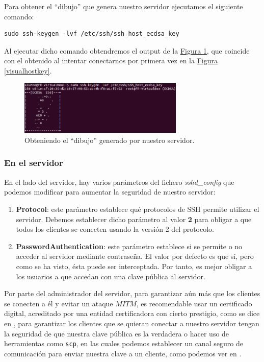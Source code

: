 \documentclass[10pt,a4paper,spanish]{article}
\begin{document}
Para obtener el ``dibujo'' que genera nuestro servidor ejecutamos el siguiente comando:
\begin{verbatim}
sudo ssh-keygen -lvf /etc/ssh/ssh_host_ecdsa_key
\end{verbatim}

Al ejecutar dicho comando obtendremos el output de la \hyperref[visualhostkey1]{Figura \ref*{visualhostkey1}}, que coincide con el obtenido al intentar conectarnos por primera vez en la \hyperref[visualhostkey]{Figura \ref*{visualhostkey}}.

\begin{figure}[!h]
    \centering
    \includegraphics[width=0.7\textwidth]{comprobacion_visualkey}
    \caption{Obteniendo el ``dibujo'' generado por nuestro servidor.}
    \label{visualhostkey1}
\end{figure}

\subsubsection{En el servidor}
En el lado del servidor, hay varios parámetros del fichero \textit{sshd\_config} que podemos modificar para aumentar la seguridad de nuestro servidor:
\begin{enumerate}[$\bullet$]
    \item \textbf{Protocol}: este parámetro establece qué protocolos de SSH permite utilizar el servidor. Debemos establecer dicho parámetro al valor \textbf{2} para obligar a que todos los clientes se conecten usando la versión 2 del protocolo.
    \item \textbf{PasswordAuthentication}: este parámetro establece si se permite o no acceder al servidor mediante contraseña. El valor por defecto es que sí, pero como se ha visto, ésta puede ser interceptada. Por tanto, es mejor obligar a los usuarios a que accedan con una clave pública al servidor.
\end{enumerate}

Por parte del administrador del servidor, para garantizar aún más que los clientes se conecten a él y evitar un ataque $MITM$, es recomendable usar un certificado digital, acreditado por una entidad certificadora con cierto prestigio, como se dice en \cite{ca}, para garantizar los clientes que se quieran conectar a nuestro servidor tengan la seguridad de que nuestra clave pública es la verdadera o hacer uso de herramientas como \texttt{scp}, en las cuales podemos establecer un canal seguro de comunicación para enviar nuestra clave a un cliente, como podemos ver en \cite{scp}.

 

\end{document}
